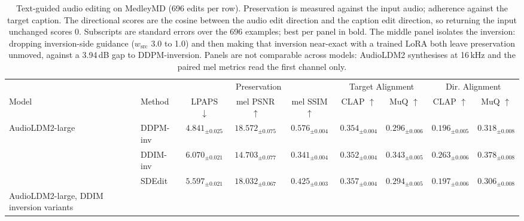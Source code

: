 %

\begin{table}[t]
  \centering
  \caption{Text-guided audio editing on MedleyMD (696 edits per row).
    Preservation is measured against the input audio; adherence against the target caption.
    The directional scores are the cosine between the audio edit direction and the caption edit
    direction, so returning the input unchanged scores $0$. Subscripts are standard errors over
    the 696 examples; best per panel in bold. The middle panel isolates the inversion: dropping
    inversion-side guidance ($w_{\mathrm{src}}$ 3.0 to 1.0) and then making that inversion
    near-exact with a trained LoRA both leave preservation unmoved, against a 3.94\,dB gap to
    DDPM-inversion. Panels are not comparable across models: AudioLDM2 synthesises at 16\,kHz
    and the paired mel metrics read the first channel only.}
  \label{tab:medleymd-editing}
  \small
  \begin{tabular}{ll ccc cccc}
    \toprule
    & & \multicolumn{3}{c}{Preservation} & \multicolumn{2}{c}{Target Alignment} & \multicolumn{2}{c}{Dir. Alignment} \\
    \cmidrule(lr){3-5} \cmidrule(lr){6-7} \cmidrule(lr){8-9}
    Model & Method & LPAPS $\downarrow$ & mel PSNR $\uparrow$ & mel SSIM $\uparrow$
      & CLAP $\uparrow$ & MuQ $\uparrow$ & CLAP $\uparrow$ & MuQ $\uparrow$ \\
    \midrule
    \multirow{3}{*}{AudioLDM2-large}
      & DDPM-inv & $\mathbf{4.841}_{\pm 0.025}$ & $\mathbf{18.572}_{\pm 0.075}$ & $\mathbf{0.576}_{\pm 0.004}$ & $0.354_{\pm 0.004}$ & $0.296_{\pm 0.006}$ & $0.196_{\pm 0.005}$ & $0.318_{\pm 0.008}$ \\
      & DDIM-inv & $6.070_{\pm 0.021}$ & $14.703_{\pm 0.077}$ & $0.341_{\pm 0.004}$ & $0.352_{\pm 0.004}$ & $\mathbf{0.343}_{\pm 0.005}$ & $\mathbf{0.263}_{\pm 0.006}$ & $\mathbf{0.378}_{\pm 0.008}$ \\
      & SDEdit   & $5.597_{\pm 0.021}$ & $18.032_{\pm 0.067}$ & $0.425_{\pm 0.003}$ & $\mathbf{0.357}_{\pm 0.004}$ & $0.294_{\pm 0.005}$ & $0.197_{\pm 0.006}$ & $0.306_{\pm 0.008}$ \\
    \midrule
    \multirow{4}{*}{AudioLDM2-large, DDIM inversion variants}

\end{tabular}
\end{table}

